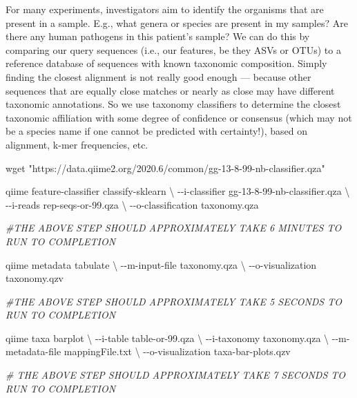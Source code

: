 \documentclass[
]{book}
\newenvironment{Shaded}{\begin{snugshade}}{\end{snugshade}}
\newcommand{\CommentTok}[1]{\textcolor[rgb]{0.56,0.35,0.01}{\textit{#1}}}
\newcommand{\DataTypeTok}[1]{\textcolor[rgb]{0.13,0.29,0.53}{#1}}
\newcommand{\ExtensionTok}[1]{#1}
\newcommand{\FunctionTok}[1]{\textcolor[rgb]{0.00,0.00,0.00}{#1}}
\newcommand{\NormalTok}[1]{#1}
\newcommand{\StringTok}[1]{\textcolor[rgb]{0.31,0.60,0.02}{#1}}
\begin{document}
For many experiments, investigators aim to identify the organisms that are present in a sample. E.g., what genera or species are present in my samples? Are there any human pathogens in this patient's sample? We can do this by comparing our query sequences (i.e., our features, be they ASVs or OTUs) to a reference database of sequences with known taxonomic composition. Simply finding the closest alignment is not really good enough --- because other sequences that are equally close matches or nearly as close may have different taxonomic annotations. So we use taxonomy classifiers to determine the closest taxonomic affiliation with some degree of confidence or consensus (which may not be a species name if one cannot be predicted with certainty!), based on alignment, k-mer frequencies, etc.

\begin{Shaded}
\begin{Highlighting}[]

\FunctionTok{wget} \StringTok{"https://data.qiime2.org/2020.6/common/gg{-}13{-}8{-}99{-}nb{-}classifier.qza"}

\ExtensionTok{qiime}\NormalTok{ feature{-}classifier classify{-}sklearn }\DataTypeTok{\textbackslash{}}
\NormalTok{{-}{-}i{-}classifier gg{-}13{-}8{-}99{-}nb{-}classifier.qza }\DataTypeTok{\textbackslash{}}
\NormalTok{{-}{-}i{-}reads rep{-}seqs{-}or{-}99.qza }\DataTypeTok{\textbackslash{}}
\NormalTok{{-}{-}o{-}classification taxonomy.qza}

\CommentTok{\#THE ABOVE STEP SHOULD APPROXIMATELY TAKE 6 MINUTES TO RUN TO COMPLETION}

\ExtensionTok{qiime}\NormalTok{ metadata tabulate }\DataTypeTok{\textbackslash{}}
\NormalTok{{-}{-}m{-}input{-}file taxonomy.qza }\DataTypeTok{\textbackslash{}}
\NormalTok{{-}{-}o{-}visualization taxonomy.qzv}

\CommentTok{\#THE ABOVE STEP SHOULD APPROXIMATELY TAKE 5 SECONDS TO RUN TO COMPLETION}

\ExtensionTok{qiime}\NormalTok{ taxa barplot }\DataTypeTok{\textbackslash{}}
\NormalTok{{-}{-}i{-}table table{-}or{-}99.qza }\DataTypeTok{\textbackslash{}}
\NormalTok{{-}{-}i{-}taxonomy taxonomy.qza }\DataTypeTok{\textbackslash{}}
\NormalTok{{-}{-}m{-}metadata{-}file mappingFile.txt }\DataTypeTok{\textbackslash{}}
\NormalTok{{-}{-}o{-}visualization taxa{-}bar{-}plots.qzv}

\CommentTok{\# THE ABOVE STEP SHOULD APPROXIMATELY TAKE 7 SECONDS TO RUN TO COMPLETION}
\end{Highlighting}
\end{Shaded}
\end{document}
